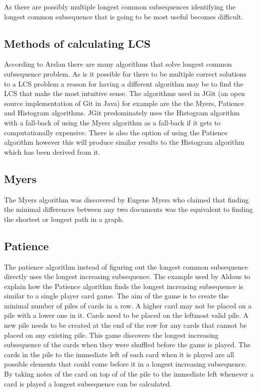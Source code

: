 As there are possibly multiple longest common subsequences identifying the longest common subsequence that is going to be most useful becomes difficult.

\subsection{Methods of calculating LCS}
According to Arslan \cite{Arslan2010} there are many algorithms that solve longest common subsequence problem. As is it possible for there to be multiple correct solutions to a LCS problem a reason for having a different algorithm may be to find the LCS that make the most intuitive sense. The algorithms used in JGit (an open source implementation of Git in Java) for example are the the Myers, Patience and Histogram algorithms. JGit predominately uses the Histogram algorithm with a fall-back of using the Myers algorithm as a fall-back if it gets to computationally expensive.  There is also the option of using the Patience algorithm however this will produce similar results to the Histogram algorithm which has been derived from it. 

\subsection{Myers}
The Myers algorithm was discovered by Eugene Myers \cite{Myers1986} who claimed that finding the minimal differences between any two documents was the equivalent to finding the shortest or longest path in a graph.



\subsection{Patience}
The patience algorithm instead of figuring out the longest common subsequence directly uses the longest increasing subsequence. 
The example used by Aldous \cite{Aldous1999} to explain how the Patience algorithm finds the longest increasing subsequence is similar to a single player card game.
The aim of the game is to create the minimal number of piles of cards in a row.
A higher card may not be placed on a pile with a lower one in it.
Cards need to be placed on the leftmost valid pile. 
A new pile needs to be created at the end of the row for any cards that cannot be placed on any existing pile.
This game discovers the longest increasing subsequence of the cards when they were shuffled before the game is played.
The cards in the pile to the immediate left of each card when it is played are all possible elements that could come before it in a longest increasing subsequence.
By taking notes of the card on top of of the pile to the immediate left whenever a card is played a longest subsequence can be calculated.     

